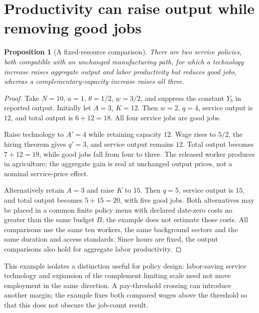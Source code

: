 \documentclass[11pt,a4paper]{article}
\newtheorem{proposition}[theorem]{Proposition}
\theoremstyle{definition}
\theoremstyle{remark}
\begin{document}
\section{Productivity can raise output while removing good jobs}
\begin{proposition}[A fixed-resource comparison]\label{pr:counter}
There are two service policies, both compatible with an unchanged manufacturing path, for which a technology increase raises aggregate output and labor productivity but reduces good jobs, whereas a complementary-capacity increase raises all three.
\end{proposition}
\begin{proof}
Take $N=10$, $a=1$, $\theta=1/2$, $\underline w=3/2$, and suppress the constant $Y_b$ in reported output. Initially let $A=3$, $K=12$. Then $w=2$, $q=4$, service output is $12$, and total output is $6+12=18$. All four service jobs are good jobs.

Raise technology to $A'=4$ while retaining capacity $12$. Wage rises to $5/2$, the hiring theorem gives $q'=3$, and service output remains $12$. Total output becomes $7+12=19$, while good jobs fall from four to three. The released worker produces in agriculture; the aggregate gain is real at unchanged output prices, not a nominal service-price effect.

Alternatively retain $A=3$ and raise $K$ to $15$. Then $q=5$, service output is $15$, and total output becomes $5+15=20$, with five good jobs. Both alternatives may be placed in a common finite policy menu with declared date-zero costs no greater than the same budget $B$; the example does not estimate those costs. All comparisons use the same ten workers, the same background sectors and the same duration and access standards. Since hours are fixed, the output comparisons also hold for aggregate labor productivity.
\end{proof}

This example isolates a distinction useful for policy design: labor-saving service technology and expansion of the complement limiting scale need not move employment in the same direction. A pay-threshold crossing can introduce another margin; the example fixes both compared wages above the threshold so that this does not obscure the job-count result.
\end{document}
